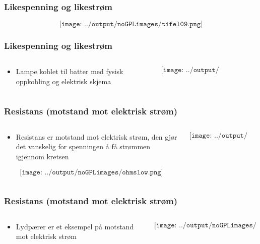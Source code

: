 \documentclass[aspectratio=169,xcolor=dvipsnames]{beamer}
\begin{document}
\begin{frame}
	\frametitle{Likespenning og likestrøm}

			$$\texttt{[image: ../output/noGPLimages/tifel09.png]}$$
\end{frame}


\begin{frame}
	\frametitle{Likespenning og likestrøm}

	\begin{columns}
		\begin{column}{0.3\textwidth}
			\begin{itemize}
				\item Lampe koblet til batter med fysisk oppkobling og elektrisk skjema
			\end{itemize}
		\end{column}

		\begin{column}{0.7\textwidth}
			$$\texttt{[image: ../output/noGPLimages/tifel11.png]}$$
		\end{column}
	\end{columns}
\end{frame}

\begin{frame}
	\frametitle{Resistans (motstand mot elektrisk strøm)}

	\begin{columns}
		\begin{column}{0.5\textwidth}
			\begin{itemize}
				\item Resistans er motstand mot elektrisk strøm, den gjør det vanskelig for spenningen å få strømmen igjennom kretsen
			\end{itemize}
			$$\texttt{[image: ../output/noGPLimages/ohmslow.png]}$$
		\end{column}

		\begin{column}{0.5\textwidth}
			$$\texttt{[image: ../output/noGPLimages/tifel12.png]}$$
		\end{column}
	\end{columns}
\end{frame}

\begin{frame}
	\frametitle{Resistans (motstand mot elektrisk strøm)}

	\begin{columns}
		\begin{column}{0.5\textwidth}
			\begin{itemize}
				\item Lydpærer er et eksempel på motstand mot elektrisk strøm
			\end{itemize}
		\end{column}

		\begin{column}{0.5\textwidth}
			$$\texttt{[image: ../output/noGPLimages/tifel13.png]}$$
		\end{column}
	\end{columns}
\end{frame}
\end{document}
